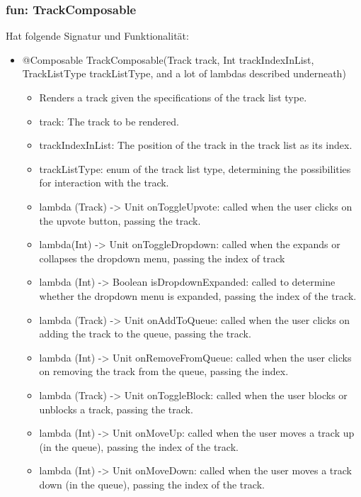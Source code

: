 \documentclass[oneside, ngerman]{sdqtechreport}
\begin{document}
\subsubsection{fun: TrackComposable}

Hat folgende Signatur und Funktionalität:
\begin{itemize}
    \item @Composable TrackComposable(Track track, Int trackIndexInList, TrackListType trackListType, and a lot of lambdas described underneath)
    \begin{itemize}
        \item Renders a track given the specifications of the track list type.
        \item track: The track to be rendered.
        \item trackIndexInList: The position of the track in the track list as its index.
        \item trackListType: enum of the track list type, determining the possibilities for interaction with the track.
        \item lambda (Track) -> Unit onToggleUpvote: called when the user clicks on the upvote button, passing the track.
        \item lambda(Int) -> Unit onToggleDropdown: called when the expands or collapses the dropdown menu, passing the index of track
        \item lambda (Int) -> Boolean isDropdownExpanded: called to determine whether the dropdown menu is expanded,  passing the index of the track.
        \item lambda (Track) -> Unit onAddToQueue: called when the user clicks on adding the track to the queue, passing the track.
        \item lambda (Int) -> Unit onRemoveFromQueue: called when the user clicks on removing the track from the queue, passing the index.
        \item lambda (Track) -> Unit onToggleBlock: called when the user blocks or unblocks a track, passing the track.
        \item lambda (Int) -> Unit onMoveUp: called when the user moves a track up (in the queue), passing the index of the track.
        \item lambda (Int) -> Unit onMoveDown: called when the user moves a track down (in the queue), passing the index of the track.
    \end{itemize}
\end{itemize}
\end{document}
